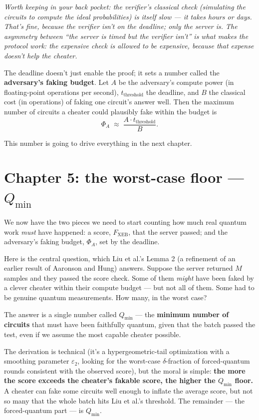 \documentclass[11pt]{article}
\newenvironment{aside}{\par\medskip\noindent\itshape\small\color{black!70}}{\normalfont\par\medskip}
\newcommand{\formula}[1]{\[\boxed{#1}\]}
\newcommand{\Fxeb}{F_{\text{XEB}}}
\newcommand{\Qmin}{Q_{\min}}
\newcommand{\Phia}{\Phi_{\!A}}
\newcommand{\eps}{\varepsilon}
\begin{document}
\begin{aside}
Worth keeping in your back pocket: the verifier's classical check (simulating the circuits to compute the ideal probabilities) is \emph{itself} slow --- it takes hours or days. That's fine, because the verifier isn't on the deadline; only the server is. The asymmetry between ``the server is timed but the verifier isn't'' is what makes the protocol work: the expensive check is allowed to be expensive, because that expense doesn't help the cheater.
\end{aside}

The deadline doesn't just enable the proof; it sets a number called the \textbf{adversary's faking budget}. Let $A$ be the adversary's compute power (in floating-point operations per second), $t_{\text{threshold}}$ the deadline, and $B$ the classical cost (in operations) of faking one circuit's answer well. Then the maximum number of circuits a cheater could plausibly fake within the budget is
\formula{\Phia \;\approx\; \frac{A \cdot t_{\text{threshold}}}{B}.}

\noindent This number is going to drive everything in the next chapter.

\section{Chapter 5: the worst-case floor --- $\Qmin$}

We now have the two pieces we need to start counting how much real quantum work \emph{must} have happened: a score, $\Fxeb$, that the server passed; and the adversary's faking budget, $\Phia$, set by the deadline.

Here is the central question, which Liu et al.'s Lemma 2 (a refinement of an earlier result of Aaronson and Hung) answers. Suppose the server returned $M$ samples and they passed the score check. Some of them \emph{might} have been faked by a clever cheater within their compute budget --- but not all of them. Some had to be genuine quantum measurements. How many, in the worst case?

The answer is a single number called $\Qmin$ --- the \textbf{minimum number of circuits} that must have been faithfully quantum, given that the batch passed the test, even if we assume the most capable cheater possible.

The derivation is technical (it's a hypergeometric-tail optimization with a smoothing parameter $\eps_2$, looking for the worst-case $\delta$-fraction of forced-quantum rounds consistent with the observed score), but the moral is simple: \textbf{the more the score exceeds the cheater's fakable score, the higher the $\Qmin$ floor.} A cheater can fake some circuits well enough to inflate the average score, but not so many that the whole batch hits Liu et al.'s threshold. The remainder --- the forced-quantum part --- is $\Qmin$.
\end{document}
